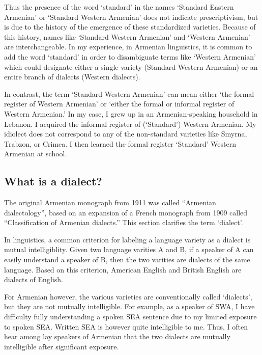Thus the presence of the word `standard' in the names `Standard Eastern Armenian' or `Standard Western Armenian' does not indicate prescriptivism, but is due to the history of the emergence of these standardized varieties. Because of this history, names like `Standard Western Armenian' and `Western Armenian' are interchangeable. In my experience, in Armenian linguistics, it is common to add the word `standard' in order to disambiguate terms like `Western Armenian' which could designate either a single variety (Standard Western Armenian) or an entire branch of dialects (Western dialects). 

In contrast, the term `Standard Western Armenian' can mean either `the formal register of Western Armenian' or `either the formal or informal register of Western Armenian.' In my case, I grew up in an Armenian-speaking household in Lebanon. I acquired the informal register of (`Standard') Western Armenian. My idiolect does not correspond to any of the non-standard varieties like Smyrna, Trabzon, or Crimea. I then learned the formal register `Standard' Western Armenian at school. 









\subsection{What is a dialect?}\label{sec:HossepIntro:armenian:whatisdialect}

The original Armenian monograph from 1911 was called ``Armenian dialectology'', based on an expansion of a French monograph from 1909 called ``Classification of Armenian dialects.'' This section clarifies the term `dialect'. 

In linguistics, a common criterion for labeling a language variety as a dialect is mutual intelligiblity. Given two language varities A and B, if a speaker of A can easily understand a speaker of B, then the two varities are dialects of the same language. Based on this criterion, American English and British English are dialects of English. 

For Armenian however, the various varieties are conventionally called `dialects', but they are not mutually intelligible. For example, as a speaker of SWA, I have difficulty fully understanding a spoken SEA sentence due to my limited exposure to spoken SEA. Written SEA is however quite intelligible to me. Thus, I often hear among lay speakers of Armenian that the two dialects are mutually intelligible after significant exposure. 

